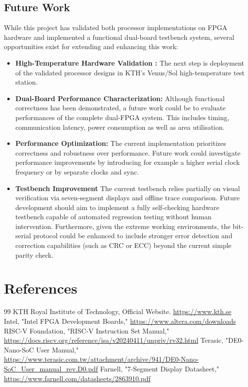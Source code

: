 \documentclass[12pt]{article}
\begin{document}
\subsection{Future Work}
While this project has validated both processor implementations on FPGA hardware and implemented a functional dual-board testbench system, several opportunities exist for extending and enhancing this work:
\begin{itemize}
    \item \textbf{High-Temperature Hardware Validation :} The next step is deployment of the validated processor designs in KTH's Venus/Sol high-temperature test station.
    \item \textbf{Dual-Board Performance Characterization:} Although functional correctness has been demonstrated, a future work could be to evaluate performances of the complete dual-FPGA system. This includes timing, communication latency, power consumption as well as area utilisation.
    \item \textbf{Performance Optimization:} The current implementation prioritizes correctness and robustness over performance. Future work could investigate performance improvements by introducing for example a higher serial clock frequency or by separate clocks and sync.
    \item \textbf{Testbench Improvement} The current testbench relies partially on visual verification via seven-segment displays and offline trace comparison. Future development should aim to implement a fully self-checking hardware testbench capable of automated regression testing without human intervention. Furthermore, given the extreme working environments, the bit-serial protocol could be enhanced to include stronger error detection and correction capabilities (such as CRC or ECC) beyond the current simple parity check.
\end{itemize}

\newpage
\section{References}

\begin{thebibliography}{99}
     KTH Royal Institute of Technology, Official Website. \url{https://www.kth.se}
     Intel, "Intel FPGA Development Boards," \url{https://www.altera.com/downloads}
     RISC-V Foundation, "RISC-V Instruction Set Manual," \url{https://docs.riscv.org/reference/isa/v20240411/unpriv/rv32.html}
     Terasic, "DE0-Nano-SoC User Manual," \url{https://www.terasic.com.tw/attachment/archive/941/DE0-Nano-SoC_User_manual_rev.D0.pdf}
     Farnell, "7-Segment Display Datasheet," \url{https://www.farnell.com/datasheets/2863910.pdf}
\end{thebibliography}
\end{document}
